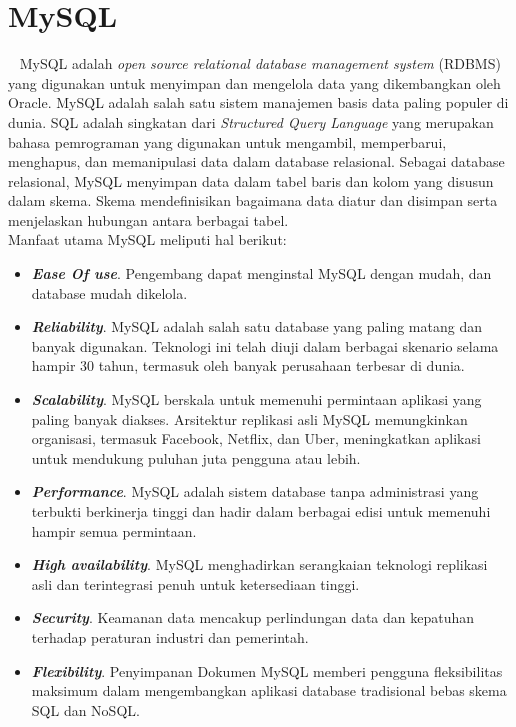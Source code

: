 \section{MySQL}
\label{sec:mysql}
~\cite{oracle:24:mysql8.4}
MySQL adalah \textit{open source relational database management system} (RDBMS) yang digunakan untuk menyimpan dan mengelola data yang dikembangkan oleh Oracle. MySQL adalah salah satu sistem manajemen basis data paling populer di dunia. SQL adalah singkatan dari \textit{Structured Query Language} yang merupakan bahasa pemrograman yang digunakan untuk mengambil, memperbarui, menghapus, dan memanipulasi data dalam database relasional. Sebagai database relasional, MySQL menyimpan data dalam tabel baris dan kolom yang disusun dalam skema. Skema mendefinisikan bagaimana data diatur dan disimpan serta menjelaskan hubungan antara berbagai tabel. \\
Manfaat utama MySQL meliputi hal berikut:
\begin{itemize}
    \item \textbf{\textit{Ease Of use}}. Pengembang dapat menginstal MySQL dengan mudah, dan database mudah dikelola.
    \item \textbf{\textit{Reliability}}. MySQL adalah salah satu database yang paling matang dan banyak digunakan. Teknologi ini telah diuji dalam berbagai skenario selama hampir 30 tahun, termasuk oleh banyak perusahaan terbesar di dunia.
    \item \textbf{\textit{Scalability}}. MySQL berskala untuk memenuhi permintaan aplikasi yang paling banyak diakses. Arsitektur replikasi asli MySQL memungkinkan organisasi, termasuk Facebook, Netflix, dan Uber, meningkatkan aplikasi untuk mendukung puluhan juta pengguna atau lebih.
    \item \textbf{\textit{Performance}}. MySQL adalah sistem database tanpa administrasi yang terbukti berkinerja tinggi dan hadir dalam berbagai edisi untuk memenuhi hampir semua permintaan.
    \item \textbf{\textit{High availability}}. MySQL menghadirkan serangkaian teknologi replikasi asli dan terintegrasi penuh untuk ketersediaan tinggi.
    \item \textbf{\textit{Security}}. Keamanan data mencakup perlindungan data dan kepatuhan terhadap peraturan industri dan pemerintah.
    \item \textbf{\textit{Flexibility}}. Penyimpanan Dokumen MySQL memberi pengguna fleksibilitas maksimum dalam mengembangkan aplikasi database tradisional bebas skema SQL dan NoSQL.
\end{itemize}

